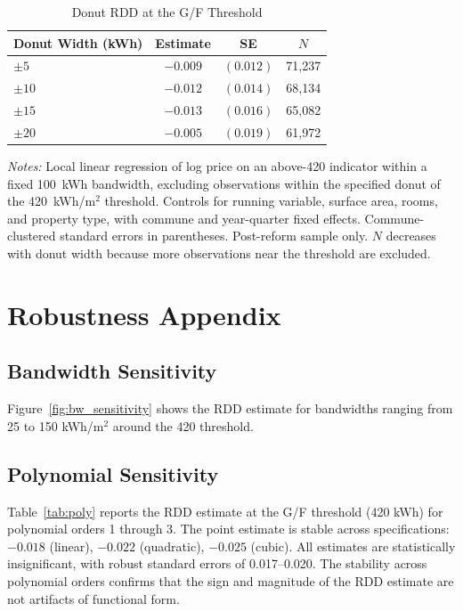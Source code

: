 \documentclass[12pt]{article}
\begin{document}
\begin{table}[H]
\centering
\caption{Donut RDD at the G/F Threshold}
\label{tab:donut}
\begin{tabular}{lccc}
\toprule
Donut Width (kWh) & Estimate & SE & $N$ \\
\midrule
$\pm 5$ & $-0.009$ & $(0.012)$ & 71,237 \\
$\pm 10$ & $-0.012$ & $(0.014)$ & 68,134 \\
$\pm 15$ & $-0.013$ & $(0.016)$ & 65,082 \\
$\pm 20$ & $-0.005$ & $(0.019)$ & 61,972 \\
\bottomrule
\end{tabular}
\begin{tablenotes}
\small
\item \textit{Notes:} Local linear regression of log price on an above-420 indicator within a fixed 100~kWh bandwidth, excluding observations within the specified donut of the 420~kWh/m$^2$ threshold. Controls for running variable, surface area, rooms, and property type, with commune and year-quarter fixed effects. Commune-clustered standard errors in parentheses. Post-reform sample only. $N$ decreases with donut width because more observations near the threshold are excluded.
\end{tablenotes}
\end{table}


\section{Robustness Appendix}
\label{sec:rob_appendix}

\subsection{Bandwidth Sensitivity}

Figure~\ref{fig:bw_sensitivity} shows the RDD estimate for bandwidths ranging from 25 to 150 kWh/m$^2$ around the 420 threshold.

\subsection{Polynomial Sensitivity}

Table~\ref{tab:poly} reports the RDD estimate at the G/F threshold (420 kWh) for polynomial orders 1 through 3. The point estimate is stable across specifications: $-0.018$ (linear), $-0.022$ (quadratic), $-0.025$ (cubic). All estimates are statistically insignificant, with robust standard errors of 0.017--0.020. The stability across polynomial orders confirms that the sign and magnitude of the RDD estimate are not artifacts of functional form.
\end{document}

